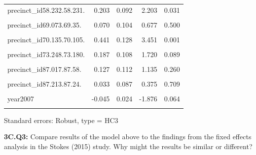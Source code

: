 \documentclass[
  letterpaper,
  DIV=11,
  numbers=noendperiod]{scrartcl}
\begin{document}
\begin{table}[!h]
\begin{threeparttable}
\begin{tabular}{lrrrr}
precinct\_id58.232.58.231. & 0.203 & 0.092 & 2.203 & 0.031\\
\addlinespace
\cellcolor{gray!10}{precinct\_id67.141.67.123.} & \cellcolor{gray!10}{0.022} & \cellcolor{gray!10}{0.115} & \cellcolor{gray!10}{0.189} & \cellcolor{gray!10}{0.850}\\
precinct\_id69.073.69.35. & 0.070 & 0.104 & 0.677 & 0.500\\
\cellcolor{gray!10}{precinct\_id70.081.70.44.} & \cellcolor{gray!10}{0.062} & \cellcolor{gray!10}{0.095} & \cellcolor{gray!10}{0.655} & \cellcolor{gray!10}{0.514}\\
precinct\_id70.135.70.105. & 0.441 & 0.128 & 3.451 & 0.001\\
\cellcolor{gray!10}{precinct\_id70.221.70.155.} & \cellcolor{gray!10}{0.247} & \cellcolor{gray!10}{0.111} & \cellcolor{gray!10}{2.217} & \cellcolor{gray!10}{0.030}\\
\addlinespace
precinct\_id73.248.73.180. & 0.187 & 0.108 & 1.720 & 0.089\\
\cellcolor{gray!10}{precinct\_id73.251.73.180.} & \cellcolor{gray!10}{0.204} & \cellcolor{gray!10}{0.102} & \cellcolor{gray!10}{1.995} & \cellcolor{gray!10}{0.050}\\
precinct\_id87.017.87.58. & 0.127 & 0.112 & 1.135 & 0.260\\
\cellcolor{gray!10}{precinct\_id87.053.87.68.} & \cellcolor{gray!10}{0.214} & \cellcolor{gray!10}{0.150} & \cellcolor{gray!10}{1.428} & \cellcolor{gray!10}{0.157}\\
precinct\_id87.213.87.24. & 0.033 & 0.087 & 0.375 & 0.709\\
\addlinespace
\cellcolor{gray!10}{precinct\_id98.009.98.12.} & \cellcolor{gray!10}{0.129} & \cellcolor{gray!10}{0.107} & \cellcolor{gray!10}{1.210} & \cellcolor{gray!10}{0.230}\\
year2007 & -0.045 & 0.024 & -1.876 & 0.064\\
\cellcolor{gray!10}{year2011} & \cellcolor{gray!10}{-0.131} & \cellcolor{gray!10}{0.036} & \cellcolor{gray!10}{-3.686} & \cellcolor{gray!10}{0.000}\\
\bottomrule
\end{tabular}
\begin{tablenotes}
\item Standard errors: Robust, type = HC3
\end{tablenotes}
\end{threeparttable}
\end{table}

\textbf{3C.Q3:} Compare results of the model above to the findings from
the fixed effects analysis in the Stokes (2015) study. Why might the
results be similar or different?
\end{document}
